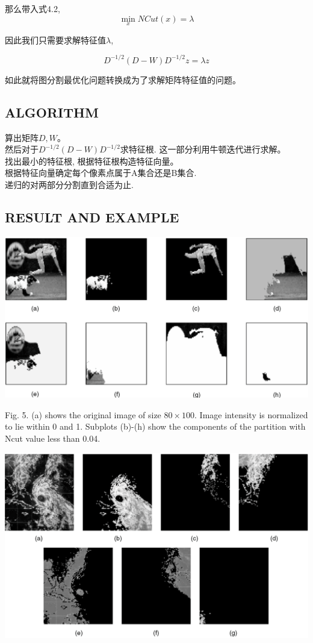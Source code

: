 \documentclass[paper=a4, fontsize=11pt]{scrartcl} %
\numberwithin{equation}{section} %
\numberwithin{figure}{section} %
\numberwithin{table}{section} %
\begin{document}
	那么带入式4.2, 
	$$\min_{x} NCut(x) = \lambda$$

	因此我们只需要求解特征值$\lambda$, 

	$$D^{-1/2}(D-W)D^{-1/2}z = \lambda z$$

	如此就将图分割最优化问题转换成为了求解矩阵特征值的问题。

\subsection{ALGORITHM}
	
	
	算出矩阵$D, W$。\\
	然后对于$D^{-1/2}(D-W)D^{-1/2}$求特征根. 这一部分利用牛顿迭代进行求解。\\
	找出最小的特征根, 根据特征根构造特征向量。\\
	根据特征向量确定每个像素点属于A集合还是B集合.\\
	递归的对两部分分割直到合适为止.

\subsection{RESULT AND EXAMPLE}
	
	\includegraphics[scale=0.3]{pic5.png}

	Fig. 5. (a) shows the original image of size $80 \times  100$. Image intensity is normalized to lie within 0 and 1. Subplots (b)-(h) show the components of the partition with Ncut value less than 0.04.

	\includegraphics[scale=0.3]{pic6.png}
\end{document}
